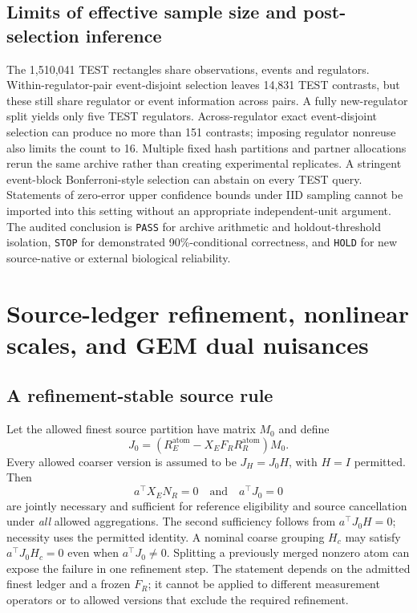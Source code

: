 \subsection{Limits of effective sample size and post-selection inference}
The 1,510,041 TEST rectangles share observations, events and regulators. Within-regulator-pair event-disjoint selection leaves 14,831 TEST contrasts, but these still share regulator or event information across pairs. A fully new-regulator split yields only five TEST regulators. Across-regulator exact event-disjoint selection can produce no more than 151 contrasts; imposing regulator nonreuse also limits the count to 16. Multiple fixed hash partitions and partner allocations rerun the same archive rather than creating experimental replicates. A stringent event-block Bonferroni-style selection can abstain on every TEST query. Statements of zero-error upper confidence bounds under IID sampling cannot be imported into this setting without an appropriate independent-unit argument. The audited conclusion is \texttt{PASS} for archive arithmetic and holdout-threshold isolation, \texttt{STOP} for demonstrated 90\%-conditional correctness, and \texttt{HOLD} for new source-native or external biological reliability.

\section{Source-ledger refinement, nonlinear scales, and GEM dual nuisances}
\label{supp:sources}
\subsection{A refinement-stable source rule}
Let the allowed finest source partition have matrix $M_0$ and define
\[
J_0=(R_E^{\mathrm{atom}}-X_EF_RR_R^{\mathrm{atom}})M_0.
\]
Every allowed coarser version is assumed to be $J_H=J_0H$, with $H=I$ permitted. Then
\[
a^\top X_EN_R=0\quad\text{and}\quad a^\top J_0=0
\]
are jointly necessary and sufficient for reference eligibility and source cancellation under \emph{all} allowed aggregations. The second sufficiency follows from $a^\top J_0H=0$; necessity uses the permitted identity. A nominal coarse grouping $H_c$ may satisfy $a^\top J_0H_c=0$ even when $a^\top J_0\ne0$. Splitting a previously merged nonzero atom can expose the failure in one refinement step. The statement depends on the admitted finest ledger and a frozen $F_R$; it cannot be applied to different measurement operators or to allowed versions that exclude the required refinement.

